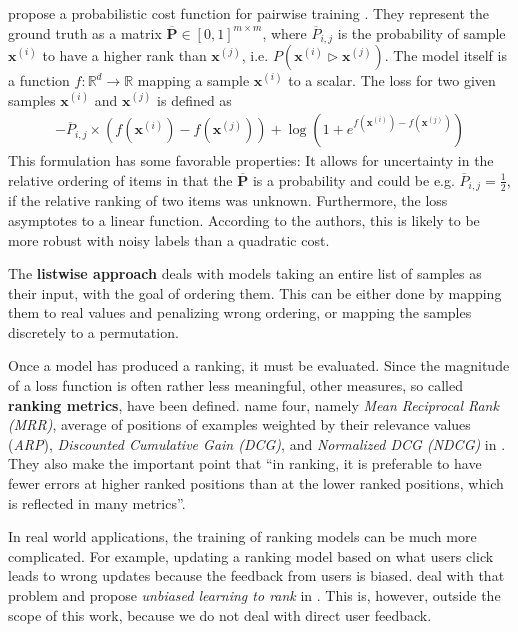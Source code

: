 \citeauthor{Burges:learningtorankwithsgd} propose a probabilistic cost function for pairwise training \cite{Burges:learningtorankwithsgd}. 
They represent the ground truth as a matrix $\bm{\overline{P}}\in[0,1]^{m\times m}$, where $\overline{P}_{i,j}$ is the probability of sample $\bm{x}^{(i)}$ to have a higher rank than $\bm{x}^{(j)}$, i.e. $P(\bm{x}^{(i)}\triangleright \bm{x}^{(j)})$. 
The model itself is a function $f:\mathbb{R}^d\rightarrow\mathbb{R}$ mapping a sample $\bm{x}^{(i)}$ to a scalar. The loss for two given samples $\bm{x}^{(i)}$ and $\bm{x}^{(j)}$ is defined as
\begin{align}
-\overline{P}_{i,j}\times\left(f\left(\bm{x}^{(i)}\right)-f\left(\bm{x}^{(j)}\right)\right)+\log\left(1+e^{f\left(\bm{x}^{(i)}\right)-f\left(\bm{x}^{(j)}\right)}\right)
\end{align}
This formulation has some favorable properties: It allows for uncertainty in the relative ordering of items in that the $\bm{\overline{P}}$ is a probability and could be e.g. $\overline{P}_{i,j}=\frac{1}{2}$, if the relative ranking of two items was unknown. Furthermore, the loss asymptotes to a linear function. According to the authors, this is likely to be more robust with noisy labels than a quadratic cost.

The \textbf{listwise approach} deals with models taking an entire list of samples as their input, with the goal of ordering them. This can be either done by mapping them to real values and penalizing wrong ordering, or mapping the samples discretely to a permutation.

Once a model has produced a ranking, it must be evaluated. Since the magnitude of a loss function is often rather less meaningful, other measures, so called \textbf{ranking metrics}, have been defined. \citeauthor{tfranking} name four, namely \textit{Mean Reciprocal Rank (MRR)}, average of positions of examples weighted by their relevance values (\textit{ARP}), \textit{Discounted Cumulative Gain (DCG)}, and \textit{Normalized DCG (NDCG)} in \cite{tfranking}. They also make the important point that ``in ranking, it is preferable to have fewer errors at higher ranked positions than at the lower ranked positions, which is reflected in many metrics''.

In real world applications, the training of ranking models can be much more complicated. For example, updating a ranking model based on what users click leads to wrong updates because the feedback from users is biased. \citeauthor{unbiasedlearningtorank} deal with that problem and propose \textit{unbiased learning to rank} in \cite{unbiasedlearningtorank}. This is, however, outside the scope of this work, because we do not deal with direct user feedback.

